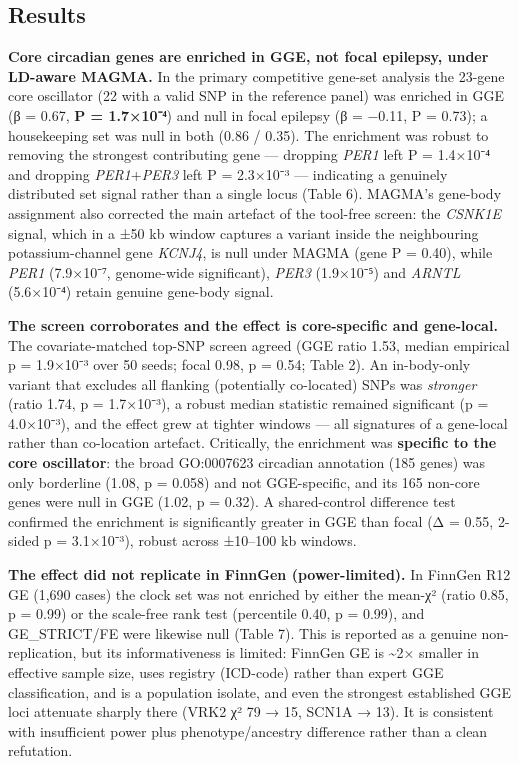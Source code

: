 \documentclass[
]{article}
\begin{document}
\subsection{Results}\label{results}

\textbf{Core circadian genes are enriched in GGE, not focal epilepsy,
under LD-aware MAGMA.} In the primary competitive gene-set analysis the
23-gene core oscillator (22 with a valid SNP in the reference panel) was
enriched in GGE (β = 0.67, \textbf{P = 1.7×10⁻⁴}) and null in focal
epilepsy (β = −0.11, P = 0.73); a housekeeping set was null in both
(0.86 / 0.35). The enrichment was robust to removing the strongest
contributing gene --- dropping \emph{PER1} left P = 1.4×10⁻⁴ and
dropping \emph{PER1}+\emph{PER3} left P = 2.3×10⁻³ --- indicating a
genuinely distributed set signal rather than a single locus (Table 6).
MAGMA's gene-body assignment also corrected the main artefact of the
tool-free screen: the \emph{CSNK1E} signal, which in a ±50 kb window
captures a variant inside the neighbouring potassium-channel gene
\emph{KCNJ4}, is null under MAGMA (gene P = 0.40), while \emph{PER1}
(7.9×10⁻⁷, genome-wide significant), \emph{PER3} (1.9×10⁻⁵) and
\emph{ARNTL} (5.6×10⁻⁴) retain genuine gene-body signal.

\textbf{The screen corroborates and the effect is core-specific and
gene-local.} The covariate-matched top-SNP screen agreed (GGE ratio
1.53, median empirical p = 1.9×10⁻³ over 50 seeds; focal 0.98, p = 0.54;
Table 2). An in-body-only variant that excludes all flanking
(potentially co-located) SNPs was \emph{stronger} (ratio 1.74, p =
1.7×10⁻³), a robust median statistic remained significant (p =
4.0×10⁻³), and the effect grew at tighter windows --- all signatures of
a gene-local rather than co-location artefact. Critically, the
enrichment was \textbf{specific to the core oscillator}: the broad
GO:0007623 circadian annotation (185 genes) was only borderline (1.08, p
= 0.058) and not GGE-specific, and its 165 non-core genes were null in
GGE (1.02, p = 0.32). A shared-control difference test confirmed the
enrichment is significantly greater in GGE than focal (Δ = 0.55, 2-sided
p = 3.1×10⁻³), robust across ±10--100 kb windows.

\textbf{The effect did not replicate in FinnGen (power-limited).} In
FinnGen R12 GE (1,690 cases) the clock set was not enriched by either
the mean-χ² (ratio 0.85, p = 0.99) or the scale-free rank test
(percentile 0.40, p = 0.99), and GE\_STRICT/FE were likewise null (Table
7). This is reported as a genuine non-replication, but its
informativeness is limited: FinnGen GE is \textasciitilde2× smaller in
effective sample size, uses registry (ICD-code) rather than expert GGE
classification, and is a population isolate, and even the strongest
established GGE loci attenuate sharply there (VRK2 χ² 79 → 15, SCN1A →
13). It is consistent with insufficient power plus phenotype/ancestry
difference rather than a clean refutation.
\end{document}
